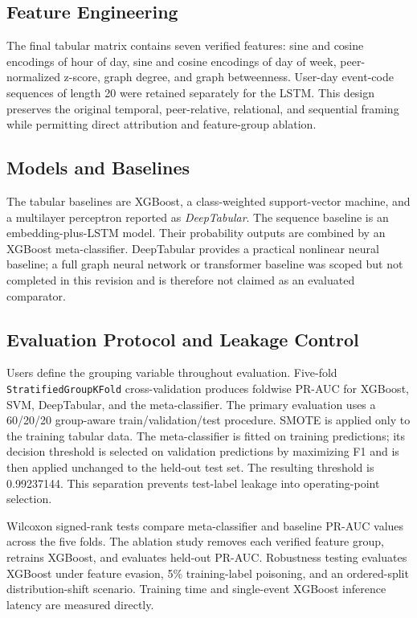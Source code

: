 \documentclass[journal]{IEEEtran}
\begin{document}
\subsection{Feature Engineering}
The final tabular matrix contains seven verified features: sine and cosine encodings of hour of day, sine and cosine encodings of day of week, peer-normalized z-score, graph degree, and graph betweenness. User-day event-code sequences of length 20 were retained separately for the LSTM. This design preserves the original temporal, peer-relative, relational, and sequential framing while permitting direct attribution and feature-group ablation.

\subsection{Models and Baselines}
The tabular baselines are XGBoost, a class-weighted support-vector machine, and a multilayer perceptron reported as \emph{DeepTabular}. The sequence baseline is an embedding-plus-LSTM model. Their probability outputs are combined by an XGBoost meta-classifier. DeepTabular provides a practical nonlinear neural baseline; a full graph neural network or transformer baseline was scoped but not completed in this revision and is therefore not claimed as an evaluated comparator.

\subsection{Evaluation Protocol and Leakage Control}
Users define the grouping variable throughout evaluation. Five-fold \texttt{StratifiedGroupKFold} cross-validation produces foldwise PR-AUC for XGBoost, SVM, DeepTabular, and the meta-classifier. The primary evaluation uses a 60/20/20 group-aware train/validation/test procedure. SMOTE is applied only to the training tabular data. The meta-classifier is fitted on training predictions; its decision threshold is selected on validation predictions by maximizing F1 and is then applied unchanged to the held-out test set. The resulting threshold is 0.99237144. This separation prevents test-label leakage into operating-point selection.

Wilcoxon signed-rank tests compare meta-classifier and baseline PR-AUC values across the five folds. The ablation study removes each verified feature group, retrains XGBoost, and evaluates held-out PR-AUC. Robustness testing evaluates XGBoost under feature evasion, 5\% training-label poisoning, and an ordered-split distribution-shift scenario. Training time and single-event XGBoost inference latency are measured directly.
\end{document}
